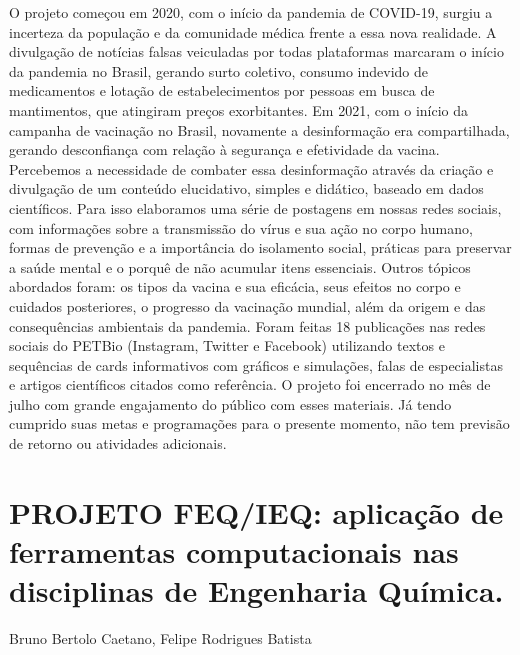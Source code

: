 O projeto começou em 2020, com o início da pandemia de COVID-19, surgiu a incerteza da
população e da comunidade médica frente a essa nova realidade. A divulgação de notícias falsas
veiculadas por todas plataformas marcaram o início da pandemia no Brasil, gerando surto
coletivo, consumo indevido de medicamentos e lotação de estabelecimentos por pessoas em
busca de mantimentos, que atingiram preços exorbitantes. Em 2021, com o início da campanha
de vacinação no Brasil, novamente a desinformação era compartilhada, gerando desconfiança
com relação à segurança e efetividade da vacina. Percebemos a necessidade de combater essa
desinformação através da criação e divulgação de um conteúdo elucidativo, simples e didático,
baseado em dados científicos. Para isso elaboramos uma série de postagens em nossas redes
sociais, com informações sobre a transmissão do vírus e sua ação no corpo humano, formas de
prevenção e a importância do isolamento social, práticas para preservar a saúde mental e o
porquê de não acumular itens essenciais. Outros tópicos abordados foram: os tipos da vacina e
sua eficácia, seus efeitos no corpo e cuidados posteriores, o progresso da vacinação mundial,
além da origem e das consequências ambientais da pandemia. Foram feitas 18 publicações nas
redes sociais do PETBio (Instagram, Twitter e Facebook) utilizando textos e sequências de cards
informativos com gráficos e simulações, falas de especialistas e artigos científicos citados como
referência. O projeto foi encerrado no mês de julho com grande engajamento do público com
esses materiais. Já tendo cumprido suas metas e programações para o presente momento, não
tem previsão de retorno ou atividades adicionais.



\section{PROJETO FEQ/IEQ: aplicação de ferramentas computacionais nas disciplinas de Engenharia Química.}

Bruno Bertolo Caetano, Felipe Rodrigues Batista

